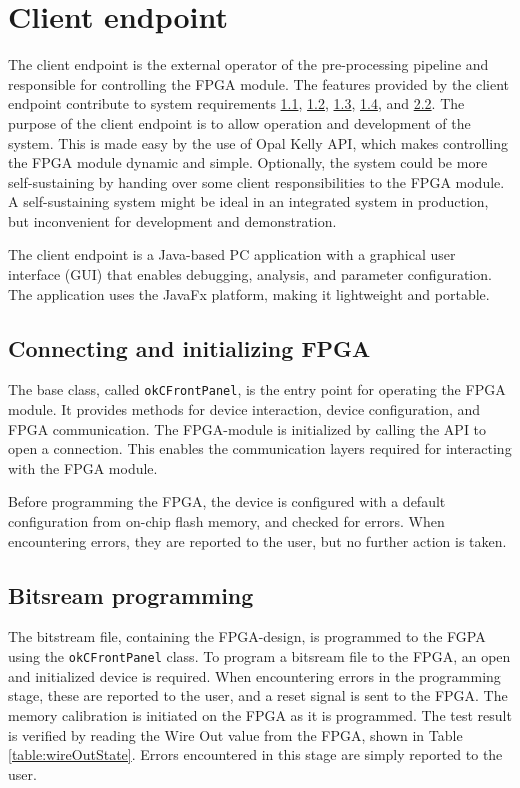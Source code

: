 \documentclass[12pt]{report}
\begin{document}
\section{Client endpoint}
The client endpoint is the external operator of the pre-processing pipeline and responsible for controlling the FPGA module. The features provided by the client endpoint contribute to system requirements \hyperref[req1.1]{1.1}, \hyperref[req1.2]{1.2}, \hyperref[req1.3]{1.3}, \hyperref[req1.4]{1.4}, and \hyperref[req2.2]{2.2}. The purpose of the client endpoint is to allow operation and development of the system. This is made easy by the use of Opal Kelly API, which makes controlling the FPGA module dynamic and simple. Optionally, the system could be more self-sustaining by handing over some client responsibilities to the FPGA module. A self-sustaining system might be ideal in an integrated system in production, but inconvenient for development and demonstration.
\par
The client endpoint is a Java-based PC application with a graphical user interface (GUI) that enables debugging, analysis, and parameter configuration. The application uses the JavaFx platform, making it lightweight and portable.
\par

\subsection{Connecting and initializing FPGA}
The base class, called \texttt{okCFrontPanel}, is the entry point for operating the FPGA module. It provides methods for device interaction, device configuration, and FPGA communication. The FPGA-module is initialized by calling the API to open a connection. This enables the communication layers required for interacting with the FPGA module. \citep*{FrontPanelMan}
\par
Before programming the FPGA, the device is configured with a default configuration from on-chip flash memory, and checked for errors. When encountering errors, they are reported to the user, but no further action is taken.

\subsection{Bitsream programming}
The bitstream file, containing the FPGA-design, is programmed to the FGPA using the \texttt{okCFrontPanel} class. To program a bitsream file to the FPGA, an open and initialized device is required. When encountering errors in the programming stage, these are reported to the user, and a reset signal is sent to the FPGA. The memory calibration is initiated on the FPGA as it is programmed. The test result is verified by reading the Wire Out value from the FPGA, shown in Table \ref*{table:wireOutState}. Errors encountered in this stage are simply reported to the user.
\end{document}
